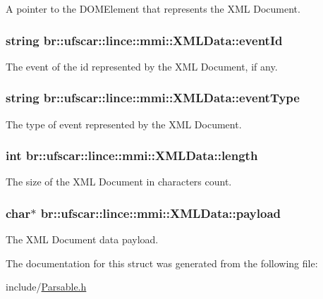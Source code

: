 A pointer to the DOMElement that represents the XML Document. 

\hypertarget{structbr_1_1ufscar_1_1lince_1_1mmi_1_1XMLData_a935adfb380fdda5f8974a2c7d3f22dbc}{
\subsubsection[{eventId}]{\setlength{\rightskip}{0pt plus 5cm}string {\bf br::ufscar::lince::mmi::XMLData::eventId}}}
\label{structbr_1_1ufscar_1_1lince_1_1mmi_1_1XMLData_a935adfb380fdda5f8974a2c7d3f22dbc}


The event of the id represented by the XML Document, if any. 

\hypertarget{structbr_1_1ufscar_1_1lince_1_1mmi_1_1XMLData_adc53af9aa385a0a3784c63b08cb4a23f}{
\subsubsection[{eventType}]{\setlength{\rightskip}{0pt plus 5cm}string {\bf br::ufscar::lince::mmi::XMLData::eventType}}}
\label{structbr_1_1ufscar_1_1lince_1_1mmi_1_1XMLData_adc53af9aa385a0a3784c63b08cb4a23f}


The type of event represented by the XML Document. 

\hypertarget{structbr_1_1ufscar_1_1lince_1_1mmi_1_1XMLData_a9ac82d47f1432982ed44302b131cb5f4}{
\subsubsection[{length}]{\setlength{\rightskip}{0pt plus 5cm}int {\bf br::ufscar::lince::mmi::XMLData::length}}}
\label{structbr_1_1ufscar_1_1lince_1_1mmi_1_1XMLData_a9ac82d47f1432982ed44302b131cb5f4}


The size of the XML Document in characters count. 

\hypertarget{structbr_1_1ufscar_1_1lince_1_1mmi_1_1XMLData_acb4585b181dc5f39f52139ca7b283e30}{
\subsubsection[{payload}]{\setlength{\rightskip}{0pt plus 5cm}char$\ast$ {\bf br::ufscar::lince::mmi::XMLData::payload}}}
\label{structbr_1_1ufscar_1_1lince_1_1mmi_1_1XMLData_acb4585b181dc5f39f52139ca7b283e30}


The XML Document data payload. 



The documentation for this struct was generated from the following file:\begin{DoxyCompactItemize}
\item 
include/\hyperlink{Parsable_8h}{Parsable.h}\end{DoxyCompactItemize}
